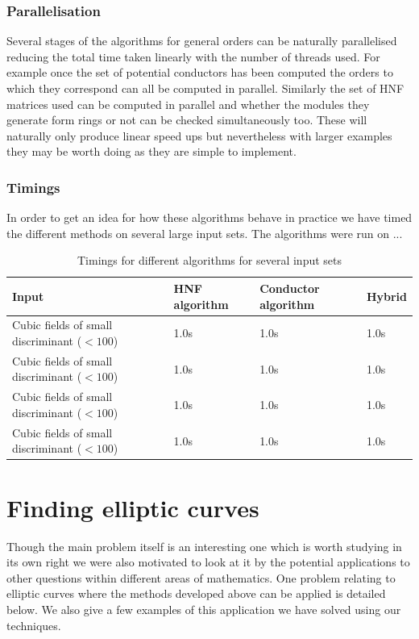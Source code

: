 \documentclass[12pt,a4paper,abstracton,bibtotoc]{scrreprt}
\theoremstyle{definition}
\begin{document}
\subsection{Parallelisation}
Several stages of the algorithms for general orders can be naturally parallelised reducing the total time taken linearly with the number of threads used.
For example once the set of potential conductors has been computed the orders to which they correspond can all be computed in parallel.
Similarly the set of HNF matrices used can be computed in parallel and whether the modules they generate form rings or not can be checked simultaneously too.
These will naturally only produce linear speed ups but nevertheless with larger examples they may be worth doing as they are simple to implement.

\subsection{Timings}
In order to get an idea for how these algorithms behave in practice we have timed the different methods on several large input sets.
The algorithms were run on ...
\begin{table}[h]
\begin{tabular}{|p{14em}|l|l|l|}
\hline
Input & HNF algorithm & Conductor algorithm & Hybrid \\
\hline
Cubic fields of small discriminant ($< 100$) & 1.0s & 1.0s & 1.0s \\
Cubic fields of small discriminant ($< 100$) & 1.0s & 1.0s & 1.0s \\
Cubic fields of small discriminant ($< 100$) & 1.0s & 1.0s & 1.0s \\
Cubic fields of small discriminant ($< 100$) & 1.0s & 1.0s & 1.0s \\
\hline
\end{tabular}
\caption{\label{tab:timings} Timings for different algorithms for several input sets}
\end{table}


\chapter{Finding elliptic curves}
\label{chap:ellapp}
Though the main problem itself is an interesting one which is worth studying in its own right we were also motivated to look at it by the potential applications to other questions within different areas of mathematics.
One problem relating to elliptic curves where the methods developed above can be applied is detailed below.
We also give a few examples of this application we have solved using our techniques.
\end{document}

